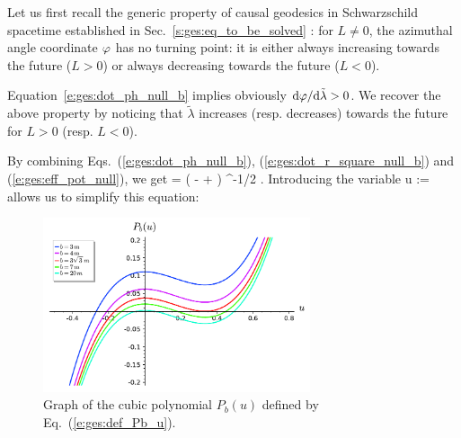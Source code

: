 Let us first recall the generic property of causal geodesics in Schwarzschild
spacetime established in Sec.~\ref{s:ges:eq_to_be_solved} : for $L\not=0$,
the azimuthal angle coordinate $\varphi$ has no turning point: it is either always increasing
towards the future
($L>0$) or always decreasing towards the future ($L<0$).
\begin{remark}
Equation~\eqref{e:ges:dot_ph_null_b} implies obviously
$\mathrm{d}\varphi/\mathrm{d}\tilde{\lambda} > 0$. We recover the above property by
noticing that $\tilde{\lambda}$ increases (resp. decreases)
towards the future for $L>0$ (resp. $L<0$).
\end{remark}
By combining Eqs.~(\ref{e:ges:dot_ph_null_b}), (\ref{e:ges:dot_r_square_null_b})
and (\ref{e:ges:eff_pot_null}), we get
\be \label{e:ges:dphi_dr_null}
     = \pm {} \left( 
        -  +    \right) ^{-1/2} .
\ee
Introducing the variable
\be
    u := 
\ee
allows us to simplify this equation:
\be \label{e:ges:dphi_du_null}
\ee

\begin{figure}
\centerline{\includegraphics[width=0.7\textwidth]{ges_polynomial_b_u.pdf}}
\caption[]{\label{f:ges:polynomial_b_u} \footnotesize
Graph of the cubic polynomial $P_b(u)$ defined by Eq.~(\ref{e:ges:def_Pb_u}).}
\end{figure}

